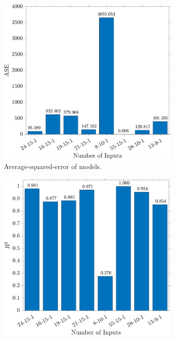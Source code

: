 \documentclass[
10pt, %
letterpaper, %
twoside, %
headinclude,footinclude, %
BCOR5mm, %
]{scrartcl}
\begin{document}
\begin{figure}[h!]
	\centering
	\begin{subfigure}[t]{0.49\linewidth}
		\centering
		\includegraphics[width=\linewidth]{figures/ASE.pdf}
		\caption{Average-squared-error of models.} 
		\label{fig:ASE}
	\end{subfigure}
	\begin{subfigure}[t]{0.49\linewidth}
		\centering
		\includegraphics[width=\linewidth]{figures/RSquared.pdf}

\end{subfigure}
\end{figure}
\end{document}
